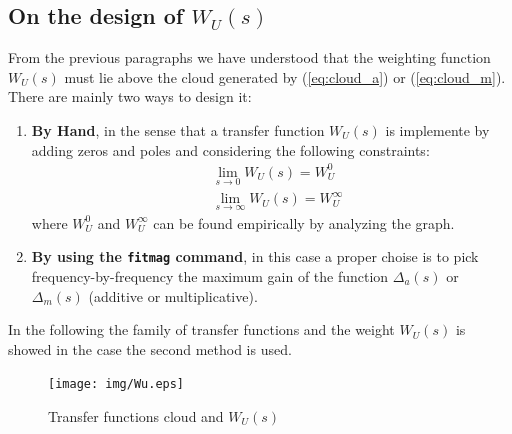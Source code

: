 \documentclass[a4paper, 12pt]{article}
\begin{document}
    \subsection{On the design of $W_U(s)$}
    From the previous paragraphs we have understood that the weighting function $W_U(s)$ must lie above the cloud generated by (\ref{eq:cloud_a}) or (\ref{eq:cloud_m}). There are mainly two ways to design it:
    \begin{enumerate}
        \itemsep-0.3em
        \item \textbf{By Hand}, in the sense that a transfer function $W_U(s)$ is implemente by adding zeros and poles and considering the following constraints:
        \begin{align}
            &\lim_{s\to{0}} W_U(s)=W_U^{0}\\
            &\lim_{s\to{\infty}} W_U(s)=W_U^{\infty}  
        \end{align}
        where $W_U^0$ and $W_U^\infty$ can be found empirically by analyzing the graph.
        \item \textbf{By using the \texttt{fitmag} command}, in this case a proper choise is to pick frequency-by-frequency the maximum gain of the function $\Delta_a(s)$ or $\Delta_m(s)$ (additive or multiplicative).
    \end{enumerate}
    In the following the family of transfer functions and the weight $W_U(s)$ is showed in the case the second method is used.

    \begin{figure}[h]
        \centering
        \texttt{[image: img/Wu.eps]}
        \caption{Transfer functions cloud and $W_U(s)$}
    \end{figure}


 
\end{document}
